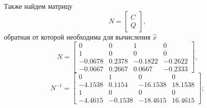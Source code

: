 \documentclass[a4paper, 12pt]{article}
\begin{document}
    Также найдем матрицу
    $$
    N=\begin{bmatrix}
        C\\Q
    \end{bmatrix},
    $$
    обратная от которой необходима для вычисления $\hat{x}$
    $$
    N=\begin{bmatrix}
    0         &0    &1         &0\\
    1         &0         &0         &0\\
   -0.0678    &0.2378   &-0.1822   &-0.2622\\
   -0.0667    &0.2667    &0.0667   &-0.2333
    \end{bmatrix},
    $$
    $$N^{-1}=\begin{bmatrix}
    0    &1         &0         &0\\
   -4.1538    &0.1154  &-16.1538   &18.1538\\
    1         &0         &0         &0\\
   -4.4615   &-0.1538  &-18.4615   &16.4615
    \end{bmatrix};
    $$
\end{document}

